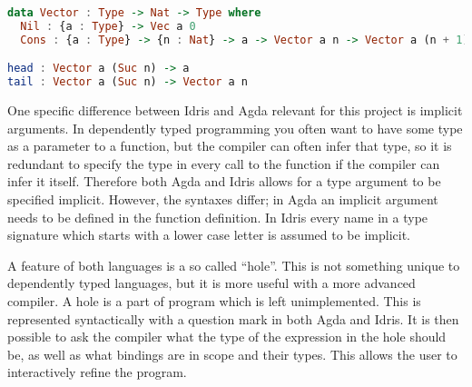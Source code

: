 \begin{lstlisting}[language=Haskell,label={lst:depex},caption={Definition of
a vector type in Idris, the type signatures of \textit{head} and \textit{tail}. \textit{n} is a type parameter, in this case it is a natural number.  }]
data Vector : Type -> Nat -> Type where
  Nil : {a : Type} -> Vec a 0
  Cons : {a : Type} -> {n : Nat} -> a -> Vector a n -> Vector a (n + 1)

head : Vector a (Suc n) -> a
tail : Vector a (Suc n) -> Vector a n
\end{lstlisting}




%

One specific difference between Idris and Agda relevant for this project is
implicit arguments. In dependently typed programming you often want to have
some type as a parameter to a function, but the compiler can often infer that
type, so it is redundant to specify the type in every call to the function
if the compiler can infer it itself. Therefore both Agda and Idris allows for
a type argument to be specified implicit. However, the syntaxes differ; in Agda
an implicit argument needs to be defined in the function definition. In Idris
every name in a type signature which starts with a lower case letter is assumed
to be implicit.

A feature of both languages is a so called ``hole''. This is not something unique
to dependently typed languages, but it is more useful with a more advanced
compiler. A hole is a part of program which is left unimplemented. This is
represented syntactically with a question mark in both Agda and Idris. It
is then possible to ask the compiler what the type of the expression in the
hole should be, as well as what bindings are in scope and their types. This
allows the user to interactively refine the program.



